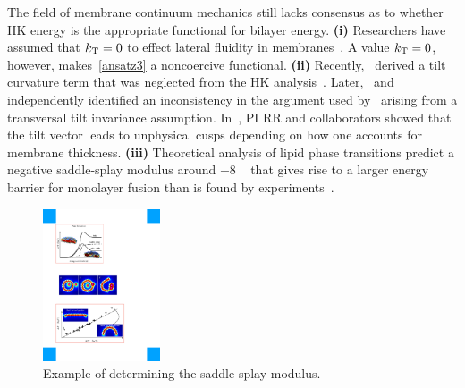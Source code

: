 The field of membrane continuum mechanics still lacks consensus as to
whether HK energy is the appropriate functional for bilayer energy.
\textbf{(i)} Researchers have assumed that $k_{\mathrm{T}} = 0$ to effect lateral fluidity in
membranes~\cite{Hamm2000, TerziDeserno17, C9SM02079A,
PhysRevE.102.042406}. 
A value $k_{\mathrm{T}} = 0$, however, makes~\eqref{ansatz3} a noncoercive functional.
\textbf{(ii)} Recently,~\cite{TerziDeserno17} derived a tilt curvature
term that was neglected from the HK analysis~\cite{Hamm2000}.
Later,~\cite{C9SM02079A} and~\cite{PhysRevE.102.042406} independently
identified an inconsistency in the argument used
by~\cite{TerziDeserno17} arising
from a transversal tilt invariance assumption.
In~\cite{RyKlYaCo16}, PI RR and collaborators showed that the tilt vector leads to unphysical cusps depending on how one accounts for membrane thickness.  
\textbf{(iii)} Theoretical analysis of lipid phase transitions predict a
negative saddle-splay modulus around $-8$ \kBT~\cite{SIEGEL2004366,
SIEGEL20085200} that gives rise to a larger energy barrier for
monolayer fusion than is found by experiments~\cite{FrRoPi17, Tran7106,
TerziDeserno17}.
\begin{figure}
\centerline{\includegraphics[width=0.31\textwidth]{Figures/SaddleSplayDiagram.pdf}}
\caption{\label{fig:saddle_splay} \footnotesize Example of determining the
  saddle splay modulus.}
\end{figure}
%
%

